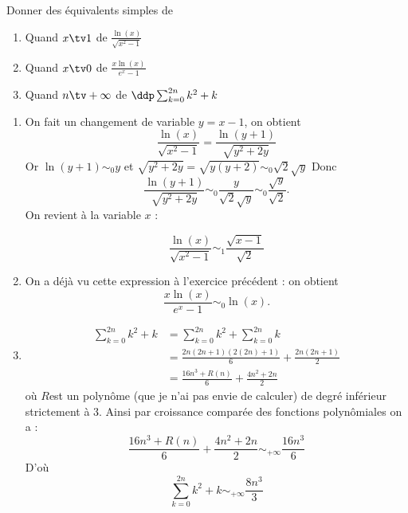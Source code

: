 



\begin{exercice}
Donner des équivalents simples de 
\begin{enumerate}
\item Quand $x\tv 1$ de $\frac{\ln(x)}{\sqrt{x^2-1}} $
\item Quand  $x\tv 0$ de $\frac{x\ln(x)}{e^x-1}$
\item Quand  $n\tv +\infty$  de $\ddp \sum_{k=0}^{2n} k^2+k  $
\end{enumerate}
\end{exercice}
\begin{correction}
\begin{enumerate}
\item 
On fait un changement de variable $y=x-1$, on obtient 
$$\frac{\ln(x)}{\sqrt{x^2-1}} = \frac{\ln(y+1)}{\sqrt{y^2+2y}} $$
Or $\ln(y+1)\sim_0 y$ et $\sqrt{y^2+2y}= \sqrt{y(y+2)}\sim_0\sqrt{2}\sqrt{y}$
Donc $$\frac{\ln(y+1)}{\sqrt{y^2+2y}} \sim_0\frac{y}{\sqrt{2}\sqrt{y}} \sim_0\frac{\sqrt{y}}{\sqrt{2}}.$$
On revient à la variable $x$ : 

$$\frac{\ln(x)}{\sqrt{x^2-1}} \sim_1 \frac{\sqrt{x-1}}{\sqrt{2}}$$

\item On a déjà vu cette expression à l'exercice précédent : on obtient 
$$\frac{x\ln(x)}{e^x-1}\sim_0 \ln(x).$$
\item  
\begin{align*}
\sum_{k=0}^{2n} k^2+k   &=\sum_{k=0}^{2n} k^2 +\sum_{k=0}^{2n} k  \\
										&= \frac{2n(2n+1)(2(2n)+1)}{6}  + \frac{2n(2n+1)}{2}\\
										&=\frac{16n^3 +R(n)}{6} + \frac{4n^2+2n}{2}
\end{align*}
où $R$est un polynôme (que je n'ai pas envie de calculer) de degré inférieur strictement à $3$. 
Ainsi par croissance comparée des fonctions polynômiales on a :
$$\frac{16n^3 +R(n)}{6} + \frac{4n^2+2n}{2}\sim_{+\infty} \frac{16n^3}{6}$$
D'où
$$\sum_{k=0}^{2n} k^2+k  \sim_{+\infty} \frac{8n^3}{3}$$


\end{enumerate}
\end{correction}



